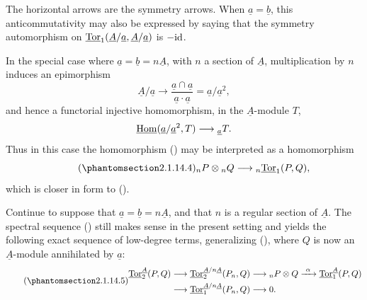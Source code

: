 The horizontal arrows are the symmetry arrows.  When
$\underline a=\underline b$, this anticommutativity may also be
expressed by saying that the symmetry automorphism on
$\uTor_1(\underline A/\underline a,\underline A/\underline a)$ is
$-\mathrm{id}$.

In the special case where
$\underline a=\underline b=n\underline A$, with $n$ a section of
$\underline A$, multiplication by $n$ induces an epimorphism
\[
 \underline A/\underline a
 \longrightarrow
 \frac{\underline a\cap\underline a}
      {\underline a\mathbin{\cdot}\underline a}
 =\underline a/\underline a^2,
\]
and hence a functorial injective homomorphism, in the
$\underline A$-module $T$,
\[
 \uHom(\underline a/\underline a^2,T)
 \longrightarrow{}_{\underline a}T.
\]
Thus in this case the homomorphism () may be interpreted as a
homomorphism
\begin{equation}\tag{\SGARefTarget{sga7.sga7i.eviii.n2-1-14-4}{2.1.14.4}}
 {}_nP\otimes{}_nQ
 \longrightarrow{}_n\uTor_1(P,Q),
\end{equation}
which is closer in form to ().

Continue to suppose that
$\underline a=\underline b=n\underline A$, and that $n$ is a regular
section of $\underline A$.  The spectral sequence () still makes
sense in the present setting and yields the following exact sequence
of low-degree terms, generalizing (), where $Q$ is now an
$\underline A$-module annihilated by $\underline a$:
\begin{equation}\tag{\SGARefTarget{sga7.sga7i.eviii.n2-1-14-5}{2.1.14.5}}
\begin{split}
 \uTor^{\underline A}_2(P,Q)
 &\longrightarrow
 \uTor^{\underline A/n\underline A}_2(P_n,Q)
 \longrightarrow{}_nP\otimes Q
 \xrightarrow{\ \alpha\ }
 \uTor^{\underline A}_1(P,Q)\\
 &\longrightarrow
 \uTor^{\underline A/n\underline A}_1(P_n,Q)
 \longrightarrow0.
\end{split}
\end{equation}


